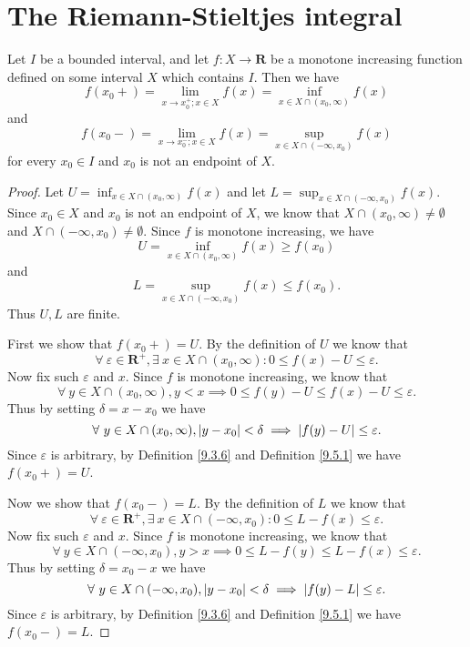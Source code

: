 \section{The Riemann-Stieltjes integral}\label{sec 11.8}

\begin{additional corollary}\label{ac 11.8.1}
Let \(I\) be a bounded interval, and let \(f : X \to \mathbf{R}\) be a monotone increasing function defined on some interval \(X\) which contains \(I\).
Then we have
\[
    f(x_0+) = \lim_{x \to x_0^+ ; x \in X} f(x) = \inf_{x \in X \cap (x_0, \infty)} f(x)
\]
and
\[
    f(x_0-) = \lim_{x \to x_0^- ; x \in X} f(x) = \sup_{x \in X \cap (-\infty, x_0)} f(x)
\]
for every \(x_0 \in I\) and \(x_0\) is not an endpoint of \(X\).
\end{additional corollary}

\begin{proof}
    Let \(U = \inf_{x \in X \cap (x_0, \infty)} f(x)\) and let \(L = \sup_{x \in X \cap (-\infty, x_0)} f(x)\).
    Since \(x_0 \in X\) and \(x_0\) is not an endpoint of \(X\), we know that \(X \cap (x_0, \infty) \neq \emptyset\) and \(X \cap (-\infty, x_0) \neq \emptyset\).
    Since \(f\) is monotone increasing, we have
    \[
        U = \inf_{x \in X \cap (x_0, \infty)} f(x) \geq f(x_0)
    \]
    and
    \[
        L = \sup_{x \in X \cap (-\infty, x_0)} f(x) \leq f(x_0).
    \]
    Thus \(U, L\) are finite.

    First we show that \(f(x_0+) = U\).
    By the definition of \(U\) we know that
    \[
        \forall\ \varepsilon \in \mathbf{R}^+, \exists\ x \in X \cap (x_0, \infty) : 0 \leq f(x) - U \leq \varepsilon.
    \]
    Now fix such \(\varepsilon\) and \(x\).
    Since \(f\) is monotone increasing, we know that
    \[
        \forall\ y \in X \cap (x_0, \infty), y < x \implies 0 \leq f(y) - U \leq f(x) - U \leq \varepsilon.
    \]
    Thus by setting \(\delta = x - x_0\) we have
    \[
        \forall\ y \in X \cap (x_0, \infty), \abs*{y - x_0} < \delta \implies \abs*{f(y) - U} \leq \varepsilon.
    \]
    Since \(\varepsilon\) is arbitrary, by Definition \ref{9.3.6} and Definition \ref{9.5.1} we have \(f(x_0+) = U\).

    Now we show that \(f(x_0-) = L\).
    By the definition of \(L\) we know that
    \[
        \forall\ \varepsilon \in \mathbf{R}^+, \exists\ x \in X \cap (-\infty, x_0) : 0 \leq L - f(x) \leq \varepsilon.
    \]
    Now fix such \(\varepsilon\) and \(x\).
    Since \(f\) is monotone increasing, we know that
    \[
        \forall\ y \in X \cap (-\infty, x_0), y > x \implies 0 \leq L - f(y) \leq L - f(x) \leq \varepsilon.
    \]
    Thus by setting \(\delta = x_0 - x\) we have
    \[
        \forall\ y \in X \cap (-\infty, x_0), \abs*{y - x_0} < \delta \implies \abs*{f(y) - L} \leq \varepsilon.
    \]
    Since \(\varepsilon\) is arbitrary, by Definition \ref{9.3.6} and Definition \ref{9.5.1} we have \(f(x_0-) = L\).
\end{proof}

